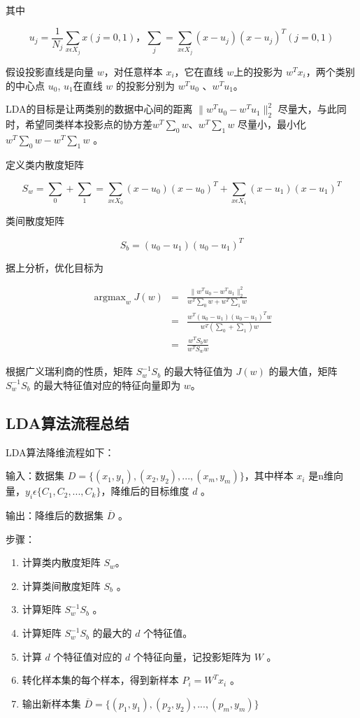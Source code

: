 其中

$$
u_j = \frac{1}{N_j} \sum_{ x\epsilon X_j} x(j=0,1)， 
\sum_j = \sum_{ x\epsilon X_j}( x-u_j)( x-u_j)^T(j=0,1)
$$

假设投影直线是向量 $ w$，对任意样本 $ x_i$，它在直线 $w$上的投影为 $ w^Tx_i$，两个类别的中心点 $u_0$, $u_1 $在直线 $w$ 的投影分别为 $ w^Tu_0$ 、$ w^Tu_1$。

LDA的目标是让两类别的数据中心间的距离 $\|  w^Tu_0 -  w^Tu_1 \|^2_2$ 尽量大，与此同时，希望同类样本投影点的协方差$ w^T \sum_0  w$、$ w^T \sum_1  w$ 尽量小，最小化 $ w^T \sum_0  w -  w^T \sum_1  w$ 。

定义类内散度矩阵

$$
S_w = \sum_0 + \sum_1 = 
	\sum_{ x\epsilon X_0}( x-u_0)( x-u_0)^T + 
	\sum_{ x\epsilon X_1}( x-u_1)( x-u_1)^T
$$

类间散度矩阵

$$S_b = (u_0 - u_1)(u_0 - u_1)^T$$

据上分析，优化目标为

\begin{eqnarray*}
	\mathop{\arg\max}_w J( w) &=& \frac{\|  w^Tu_0 -  w^Tu_1 \|^2_2}{ w^T \sum_0 w +  w^T \sum_1 w} \\
	&=& \frac{ w^T(u_0-u_1)(u_0-u_1)^T w}{ w^T(\sum_0 + \sum_1) w} \\
	&=& \frac{ w^TS_b w}{ w^TS_w w}
\end{eqnarray*}

根据广义瑞利商的性质，矩阵 $S^{-1}_{w} S_b$ 的最大特征值为 $J( w)$ 的最大值，矩阵 $S^{-1}_{w} S_b$ 的最大特征值对应的特征向量即为 $ w$。

\subsection{LDA算法流程总结}

LDA算法降维流程如下：

输入：数据集 $D = \{ (x_1,y_1),(x_2,y_2), ... ,(x_m,y_m) \}$，其中样本 $x_i $ 是n维向量，$y_i  \epsilon \{C_1, C_2, ..., C_k\}$，降维后的目标维度 $d$ 。

输出：降维后的数据集 $\overline{D} $ 。

步骤：

\begin{enumerate}
\itemsep0em 
\item 计算类内散度矩阵 $S_w$。
\item 计算类间散度矩阵 $S_b$ 。
\item 计算矩阵 $S^{-1}_wS_b$ 。
\item 计算矩阵 $S^{-1}_wS_b$ 的最大的 $d$ 个特征值。
\item 计算 $d$ 个特征值对应的 $d$ 个特征向量，记投影矩阵为 $W$ 。
\item 转化样本集的每个样本，得到新样本 $P_i = W^Tx_i$ 。
\item 输出新样本集 $\overline{D} = \{ (p_1,y_1),(p_2,y_2),...,(p_m,y_m) \}$
\end{enumerate}

